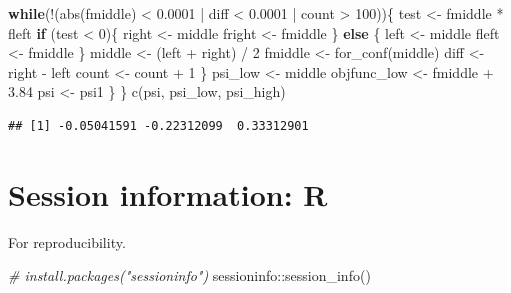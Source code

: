 \documentclass[
  10pt,
]{book}
\newenvironment{Shaded}{\begin{snugshade}}{\end{snugshade}}
\newcommand{\CommentTok}[1]{\textcolor[rgb]{0.56,0.35,0.01}{\textit{#1}}}
\newcommand{\ControlFlowTok}[1]{\textcolor[rgb]{0.13,0.29,0.53}{\textbf{#1}}}
\newcommand{\DecValTok}[1]{\textcolor[rgb]{0.00,0.00,0.81}{#1}}
\newcommand{\FloatTok}[1]{\textcolor[rgb]{0.00,0.00,0.81}{#1}}
\newcommand{\FunctionTok}[1]{\textcolor[rgb]{0.00,0.00,0.00}{#1}}
\newcommand{\NormalTok}[1]{#1}
\newcommand{\OtherTok}[1]{\textcolor[rgb]{0.56,0.35,0.01}{#1}}
\newcommand{\SpecialCharTok}[1]{\textcolor[rgb]{0.00,0.00,0.00}{#1}}
\begin{document}
\begin{Shaded}
\begin{Highlighting}[]
    \ControlFlowTok{while}\NormalTok{(}\SpecialCharTok{!}\NormalTok{(}\FunctionTok{abs}\NormalTok{(fmiddle) }\SpecialCharTok{\textless{}} \FloatTok{0.0001} \SpecialCharTok{|}\NormalTok{ diff }\SpecialCharTok{\textless{}} \FloatTok{0.0001} \SpecialCharTok{|}\NormalTok{ count }\SpecialCharTok{\textgreater{}} \DecValTok{100}\NormalTok{))\{}
\NormalTok{      test }\OtherTok{\textless{}{-}}\NormalTok{ fmiddle }\SpecialCharTok{*}\NormalTok{ fleft}
      \ControlFlowTok{if}\NormalTok{ (test }\SpecialCharTok{\textless{}} \DecValTok{0}\NormalTok{)\{}
\NormalTok{        right }\OtherTok{\textless{}{-}}\NormalTok{ middle}
\NormalTok{        fright }\OtherTok{\textless{}{-}}\NormalTok{ fmiddle}
\NormalTok{      \} }\ControlFlowTok{else}\NormalTok{ \{}
\NormalTok{        left }\OtherTok{\textless{}{-}}\NormalTok{ middle}
\NormalTok{        fleft }\OtherTok{\textless{}{-}}\NormalTok{ fmiddle}
\NormalTok{      \}}
\NormalTok{      middle }\OtherTok{\textless{}{-}}\NormalTok{ (left }\SpecialCharTok{+}\NormalTok{ right) }\SpecialCharTok{/} \DecValTok{2}
\NormalTok{      fmiddle }\OtherTok{\textless{}{-}} \FunctionTok{for\_conf}\NormalTok{(middle)}
\NormalTok{      diff }\OtherTok{\textless{}{-}}\NormalTok{ right }\SpecialCharTok{{-}}\NormalTok{ left}
\NormalTok{      count }\OtherTok{\textless{}{-}}\NormalTok{ count }\SpecialCharTok{+} \DecValTok{1}
\NormalTok{    \}}
\NormalTok{    psi\_low }\OtherTok{\textless{}{-}}\NormalTok{ middle}
\NormalTok{    objfunc\_low }\OtherTok{\textless{}{-}}\NormalTok{ fmiddle }\SpecialCharTok{+} \FloatTok{3.84}
\NormalTok{    psi }\OtherTok{\textless{}{-}}\NormalTok{ psi1}
\NormalTok{  \}}
\NormalTok{\}}
\FunctionTok{c}\NormalTok{(psi, psi\_low, psi\_high)}
\end{Highlighting}
\end{Shaded}

\begin{verbatim}
## [1] -0.05041591 -0.22312099  0.33312901
\end{verbatim}

\hypertarget{session-information-r}{%
\chapter*{Session information: R}\label{session-information-r}}

For reproducibility.

\begin{Shaded}
\begin{Highlighting}[]
\CommentTok{\# install.packages("sessioninfo")}
\NormalTok{sessioninfo}\SpecialCharTok{::}\FunctionTok{session\_info}\NormalTok{()}
\end{Highlighting}
\end{Shaded}
\end{document}
